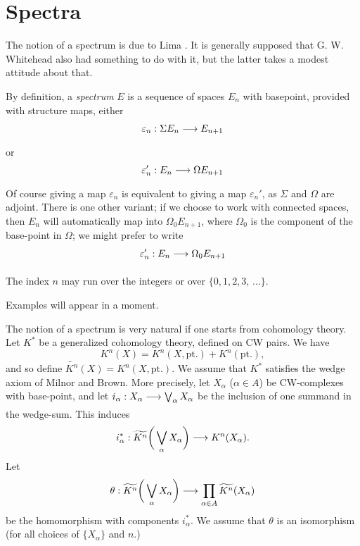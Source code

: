 \documentclass[../main]{subfiles}
\begin{document}
\chapter{Spectra} %
\label{sec:p3ch02}

The notion of a spectrum is due to Lima \cite{lima}. It is generally supposed that G. W. Whitehead also had something to do with it, but the latter takes a modest attitude about that.

By definition, a \emph{spectrum} $E$ is a sequence of spaces $E_n$ with basepoint, provided with structure maps, either
\[
\varepsilon_n: \Sigma   E_n \lar{} E_{n+1}
\]
or
\[
\varepsilon_n': E_n \lar{} \Omega E_{n+1}
\]
Of course giving a map $\varepsilon_n$ is equivalent to giving a map $\varepsilon_n'$, as $\Sigma$ and $\Omega$ are adjoint. There is one other variant; if we choose to work with connected spaces, then $E_n$ will automatically map into $\Omega_0 E_{n+1}$, where $\Omega_0$ is the component of the base-point in $\Omega$; we might prefer to write
\[
\varepsilon_n': E_n \lar{} \Omega_0 E_{n+1}
\]

The index $n$ may run over the integers or over $\{0,1,2,3,\, \hdots\}$.

Examples will appear in a moment.

The notion of a spectrum is very natural if one starts from cohomology theory. Let $K^\ast$ be a generalized cohomology theory, defined on CW pairs. We have
\[
K^n(X) = K^n(X, \mathrm{pt.}) + K^n(\mathrm{pt.}),
\]
and so define $\widetilde{K^n}(X) = K^n(X, \mathrm{pt.})$. We assume that $K^\ast$ satisfies the wedge axiom of Milnor and Brown. More precisely, let $X_\alpha$ ($\alpha\in A$) be CW-complexes with base-point, and let $i_\alpha: X_\alpha \lar{} \bigvee_\alpha X_\alpha$ be the inclusion of one summand in the wedge-sum. This induces
\[
i_\alpha^\ast:
\widetilde{K^n} \bigg( \bigvee_\alpha X_\alpha \bigg) \lar{} K^n(X_\alpha).
\]
Let
\[
\theta: 
\widetilde{K^n} \bigg( \bigvee_\alpha X_\alpha \bigg) \lar{} \prod_{\alpha\in A} \widetilde{K^n}(X_\alpha)
\]
be the homomorphism with components $i_\alpha^\ast$. We assume that $\theta$ is an isomorphism (for all choices of $\{X_\alpha\}$ and $n$.)
\end{document}
